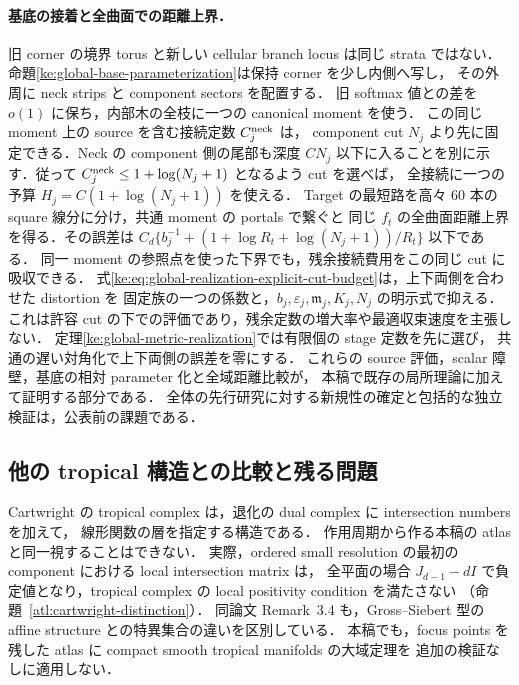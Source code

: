 \paragraph{基底の接着と全曲面での距離上界．}
旧 corner の境界 torus と新しい cellular branch locus は同じ strata ではない．
命題\ref{ke:global-base-parameterization}は保持 corner を少し内側へ写し，
その外周に neck strips と component sectors を配置する．
旧 softmax 値との差を $o(1)$ に保ち，内部木の全枝に一つの canonical moment を使う．
この同じ moment 上の source を含む接続定数 $C_j^{\rm neck}$ は，
component cut $N_j$ より先に固定できる．Neck の component 側の尾部も深度
$CN_j$ 以下に入ることを別に示す．従って
$C_j^{\rm neck}\le1+\log(N_j+1)$ となるよう cut を選べば，
全接続に一つの予算 $H_j=C(1+\log(N_j+1))$ を使える．
Target の最短路を高々 $60$ 本の square 線分に分け，共通 moment の portals で繋ぐと
同じ $f_t$ の全曲面距離上界を得る．その誤差は
$C_d\{b_j^{-1}+(1+\log R_t+\log(N_j+1))/R_t\}$ 以下である．
同一 moment の参照点を使った下界でも，残余接続費用をこの同じ cut に吸収できる．
式\eqref{ke:eq:global-realization-explicit-cut-budget}は，上下両側を合わせた distortion を
固定族の一つの係数と，$b_j,\varepsilon_j,\mathfrak m_j,K_j,N_j$ の明示式で抑える．
これは許容 cut の下での評価であり，残余定数の増大率や最適収束速度を主張しない．
定理\ref{ke:global-metric-realization}では有限個の stage 定数を先に選び，
共通の遅い対角化で上下両側の誤差を零にする．
これらの source 評価，scalar 障壁，基底の相対 parameter 化と全域距離比較が，
本稿で既存の局所理論に加えて証明する部分である．
全体の先行研究に対する新規性の確定と包括的な独立検証は，公表前の課題である．

\subsection{他の tropical 構造との比較と残る問題}

Cartwright の tropical complex は，退化の dual complex に intersection numbers を加えて，
線形関数の層を指定する構造である\cite[Definitions~2.5, 2.8; Construction~3.2]{CartwrightComplexes}．
作用周期から作る本稿の atlas と同一視することはできない．
実際，ordered small resolution の最初の component における local intersection matrix は，
全平面の場合 $J_{d-1}-dI$ で負定値となり，tropical complex の local positivity condition を満たさない
（命題~\ref{atl:cartwright-distinction}）．
同論文 Remark~3.4 も，Gross--Siebert 型の affine structure との特異集合の違いを区別している．
本稿でも，focus points を残した atlas に compact smooth tropical manifolds の大域定理を
追加の検証なしに適用しない．

